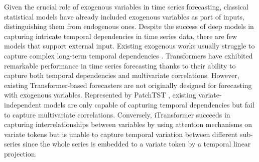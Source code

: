 \documentclass[nohyperref]{article}
\theoremstyle{plain}
\theoremstyle{definition}
\theoremstyle{remark}
\begin{document}
Given the crucial role of exogenous variables in time series forecasting, classical statistical models have already included exogenous variables as part of inputs, distinguishing them from endogenous ones. Despite the success of deep models in capturing intricate temporal dependencies in time series data, there are few models that support external input. Existing exogenous works usually struggle to capture complex long-term temporal dependencies \cite{olivares2023neural}. Transformers \cite{vaswani2017attention} have exhibited remarkable performance in time series forecasting thanks to their ability to capture both temporal dependencies and multivariate correlations. However, existing Transformer-based forecasters are not originally designed for forecasting with exogenous variables. 
Represented by PatchTST \cite{nie2022time}, existing variate-independent models are only capable of capturing temporal dependencies but fail to capture multivariate correlations.
Conversely, iTransformer \cite{liu2023itransformer} succeeds in capturing interrelationships between variables by using attention mechanisms on variate tokens but is unable to capture temporal variation between different sub-series since the whole series is embedded to a variate token by a temporal linear projection.
\end{document}
